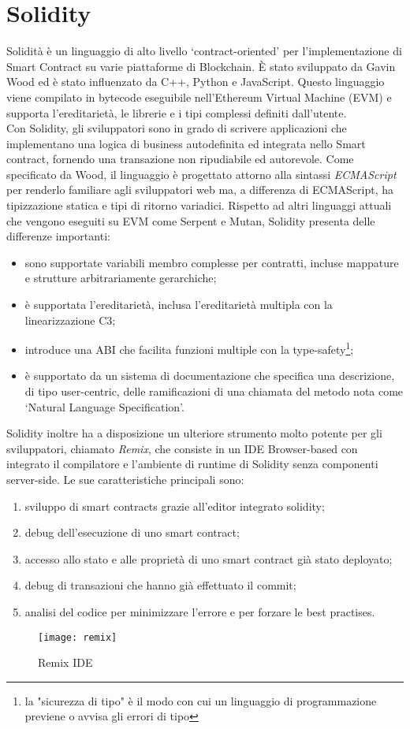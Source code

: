 \section{Solidity}
Solidità è un linguaggio di alto livello \enquote*{contract-oriented} per l'implementazione di Smart Contract su varie piattaforme di Blockchain. È stato sviluppato da Gavin Wood ed è stato influenzato da C++, Python e JavaScript. Questo linguaggio viene compilato in bytecode eseguibile nell'Ethereum Virtual Machine (EVM) e supporta l'ereditarietà, le librerie e i tipi complessi definiti dall'utente. \\ 
Con Solidity, gli sviluppatori sono in grado di scrivere applicazioni che implementano una logica di business autodefinita ed integrata nello Smart contract, fornendo una transazione non ripudiabile ed autorevole. Come specificato da Wood, il linguaggio è progettato attorno alla sintassi \emph{ECMAScript} per renderlo familiare agli sviluppatori web ma, a differenza di ECMAScript, ha tipizzazione statica e tipi di ritorno variadici. Rispetto ad altri linguaggi attuali che vengono eseguiti su EVM come Serpent e Mutan, Solidity presenta delle differenze importanti:
\begin{itemize}
	\item sono supportate variabili membro complesse per contratti, incluse mappature e strutture arbitrariamente gerarchiche;
	\item è supportata l'ereditarietà, inclusa l'ereditarietà multipla con la linearizzazione C3;
	\item introduce una ABI che facilita funzioni multiple con la type-safety\footnote{la "sicurezza di tipo" è il modo con cui un linguaggio di programmazione previene o avvisa gli errori di tipo};
	\item è supportato da un sistema di documentazione che specifica una descrizione, di tipo user-centric, delle ramificazioni di una chiamata del metodo nota come \enquote*{Natural Language Specification}.
\end{itemize}%
Solidity inoltre ha a disposizione un ulteriore strumento molto potente per gli sviluppatori, chiamato \emph{Remix}, che consiste in un IDE Browser-based con integrato il compilatore e l'ambiente di runtime di Solidity senza componenti server-side. Le sue caratteristiche principali sono:
\begin{enumerate}
	\item sviluppo di smart contracts grazie all'editor integrato solidity;
	\item debug dell'esecuzione di uno smart contract;
	\item accesso allo stato e alle proprietà di uno smart contract già stato deployato;
	\item debug di transazioni che hanno già effettuato il commit;
	\item analisi del codice per minimizzare l'errore e per forzare le best practises.
\end{enumerate}
%
\begin{figure}[H]
	\centering
	\texttt{[image: remix]}
	\caption{Remix IDE}
	\label{fig:remix ide}
\end{figure}
%
